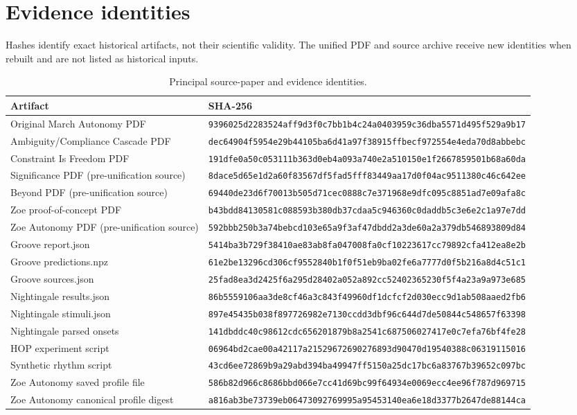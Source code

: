 \section{Evidence identities}
\label{app:evidence-identities}
Hashes identify exact historical artifacts, not their scientific validity. The unified PDF and source archive receive new identities when rebuilt and are not listed as historical inputs.
\begin{table}[htbp]
\centering
\caption{Principal source-paper and evidence identities.}
\label{tab:evidence-hashes}
{\scriptsize
\begin{tabularx}{\textwidth}{p{5.0cm}X}
\toprule
Artifact&SHA-256\\
\midrule
Original March Autonomy PDF&\texttt{9396025d2283524aff9d3f0c7bb1b4c24a0403959c36dba5571d495f529a9b17}\\
Ambiguity/Compliance Cascade PDF&\texttt{dec64904f5954e29b44105ba6d41a97f38915ffbecf972554e4eda70d8abbebc}\\
Constraint Is Freedom PDF&\texttt{191dfe0a50c053111b363d0eb4a093a740e2a510150e1f2667859501b68a60da}\\
Significance PDF (pre-unification source)&\texttt{8dace5d65e1d2a60f83567df5fad5fff83449aa17d0f04ac9511380c46c642ee}\\
Beyond PDF (pre-unification source)&\texttt{69440de23d6f70013b505d71cec0888c7e371968e9dfc095c8851ad7e09afa8c}\\
Zoe proof-of-concept PDF&\texttt{b43bdd84130581c088593b380db37cdaa5c946360c0daddb5c3e6e2c1a97e7dd}\\
Zoe Autonomy PDF (pre-unification source)&\texttt{592bbb250b3a74bebcd103e65a9f3af47dbdd2a3de60a2a379db546893809d84}\\
Groove report.json&\texttt{5414ba3b729f38410ae83ab8fa047008fa0cf10223617cc79892cfa412ea8e2b}\\
Groove predictions.npz&\texttt{61e2be13296cd306cf9552840b1f0f51eb9ba02fe6a7777d0f5b216a8d4c51c1}\\
Groove sources.json&\texttt{25fad8ea3d2425f6a295d28402a052a892cc52402365230f5f4a23a9a973e685}\\
Nightingale results.json&\texttt{86b5559106aa3de8cf46a3c843f49960df1dcfcf2d030ecc9d1ab508aaed2fb6}\\
Nightingale stimuli.json&\texttt{897e45435b038f897726982e7130ccdd3dbf96c644d7de50844c548657f63398}\\
Nightingale parsed onsets&\texttt{141dbddc40c98612cdc656201879b8a2541c687506027417e0c7efa76bf4fe28}\\
HOP experiment script&\texttt{06964bd2cae00a42117a21529672690276893d90470d19540388c06319115016}\\
Synthetic rhythm script&\texttt{43cd6ee72869b9a29abd394ba49947ff5150a25dc17bc6a83767b39652c097bc}\\
Zoe Autonomy saved profile file&\texttt{586b82d966c8686bbd066e7cc41d69bc99f64934e0069ecc4ee96f787d969715}\\
Zoe Autonomy canonical profile digest&\texttt{a816ab3be73739eb06473092769995a95453140ea6e18d3377b2647de88144ca}\\
\bottomrule
\end{tabularx}}
\end{table}

